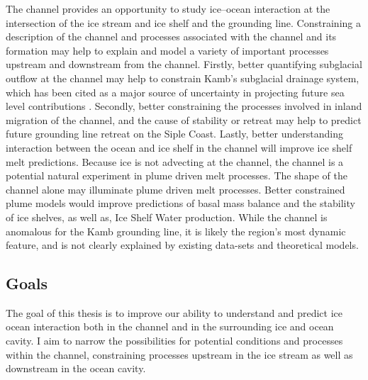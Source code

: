 The channel provides an opportunity to study ice--ocean interaction at the intersection of the ice stream and ice shelf and the grounding line.  Constraining a description of the channel and processes associated with the channel and its formation may help to explain and model a variety of important processes upstream and downstream from the channel. Firstly, better quantifying subglacial outflow at the channel may help to constrain Kamb's subglacial drainage system, which has been cited as a major source of uncertainty in projecting future sea level contributions \citep{bougamont2015reactivation}. Secondly, better constraining the processes involved in inland migration of the channel, and the cause of stability or retreat may help to predict future grounding line retreat on the Siple Coast. Lastly, better understanding interaction between the ocean and ice shelf in the channel will improve ice shelf melt predictions.  Because ice is not advecting at the channel, the channel is a potential natural experiment in plume driven melt processes. The shape of the channel alone may illuminate plume driven melt processes.  Better constrained plume models would improve predictions of basal mass balance and the stability of ice shelves, as well as, Ice Shelf Water production.  While the channel is anomalous for the Kamb grounding line, it is likely the region's most dynamic feature, and is not clearly explained by existing data-sets and theoretical models.

 
\subsection{Goals} \label{sec:objectives}

The goal of this thesis is to improve our ability to understand and predict ice ocean interaction both in the channel and in the surrounding ice and ocean cavity. I aim to narrow the possibilities for potential conditions and processes within the channel, constraining processes upstream in the ice stream as well as downstream in the ocean cavity. 

